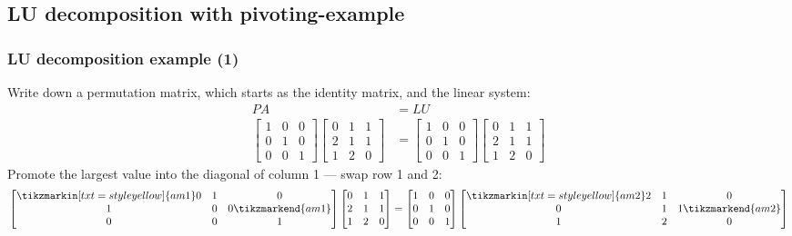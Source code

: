 \subsection*{LU decomposition with pivoting-example}
\begin{frame}[fragile]
  \frametitle{LU decomposition example (1)}
  Write down a permutation matrix, which starts as the identity matrix, and the linear system:
  \begin{align*}
    PA &= LU \\
    \begin{bmatrix}
      1 & 0 & 0\\
      0 & 1 & 0\\
      0 & 0 & 1
    \end{bmatrix} 
    \begin{bmatrix}
      0 & 1 & 1\\
      2 & 1 & 1\\
      1 & 2 & 0
      \end{bmatrix}&= 
      \begin{bmatrix}
      1 & 0 & 0\\
      0 & 1 & 0\\
      0 & 0 & 1
      \end{bmatrix}
      \begin{bmatrix}
      0 & 1 & 1\\
      2 & 1 & 1\\
      1 & 2 & 0
      \end{bmatrix}
  \end{align*}
  \pause
  Promote the largest value into the diagonal of column 1 --- swap row 1 and 2:
    \[
      \begin{bmatrix}
	\tikzmarkin[txt=style yellow]{am1} 0 & 1 & 0\\
	1 & 0 & 0 \tikzmarkend{am1}\\
	0 & 0 & 1
      \end{bmatrix} 
      \begin{bmatrix}
	0 & 1 & 1\\
	2 & 1 & 1\\
	1 & 2 & 0
      \end{bmatrix}= 
      \begin{bmatrix}
	1 & 0 & 0\\
	0 & 1 & 0\\
	0 & 0 & 1
      \end{bmatrix}
      \begin{bmatrix}
	\tikzmarkin[txt=style yellow]{am2}2 & 1 & 0\\
	0 & 1 & 1 \tikzmarkend{am2}\\
	1 & 2 & 0
      \end{bmatrix}
    \]
\end{frame}
